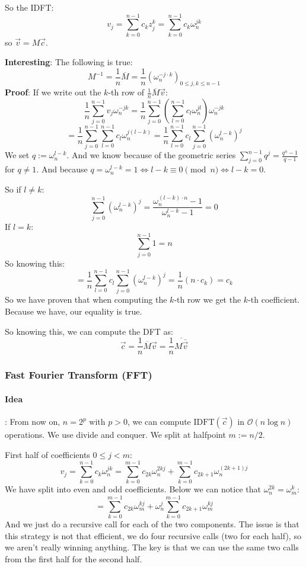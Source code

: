 \documentclass{article}
\begin{document}
So the IDFT:
\[v_j = \sum_{k=0}^{n-1}c_kz_j^k = \sum_{k=0}^{n-1}c_k\omega_n^{jk}\]
so $\vec{v} = M \vec{c}$.

\textbf{Interesting}: The following is true:
\[M^{-1} = \frac{1}{n}\overline{M} = \frac{1}{n}(\omega_n^{-j\cdot k})_{0\leq j,k \leq n-1}\]
\textbf{Proof}: If we write out the $k$-th row of $\frac{1}{n}\overline{M}\vec{v}$:
\[\frac{1}{n}\sum_{j=0}^{n-1}v_j\omega_n^{-jk} = \frac{1}{n}\sum_{j=0}^{n-1}\left(\sum_{l=0}^{n-1}c_l\omega_n^{jl}\right)\omega_n^{-jk}\]
\[ = \frac{1}{n}\sum_{j=0}^{n-1}\sum_{l=0}^{n-1}c_l \omega_n^{j(l-k)} = \frac{1}{n}\sum_{l=0}^{n-1}c_l\sum_{j=0}^{n-1}\left(\omega^{l-k}_n\right)^j\]
We set $q := \omega_n^{l-k}$. And we know because of the geometric series $\sum_{j=0}^{n-1}q^j = \frac{q^n-1}{q-1}$ for $q\neq 1$. And because $q = \omega_n^{l-k} = 1 \iff l-k \equiv 0 \pmod n \iff l-k = 0$.

So if $l\neq k$:
\[\sum_{j=0}^{n-1}(\omega_n^{l-k})^j = \frac{\omega_n^{(l-k)\cdot n} - 1}{\omega_n^{l-k} - 1} = 0\]
If $l = k$:
\[\sum_{j=0}^{n-1}1 = n\]
So knowing this:
\[ = \frac{1}{n}\sum_{l=0}^{n-1}c_l\sum_{j=0}^{n-1}(\omega_n^{l-k})^j = \frac{1}{n}(n\cdot c_k) = c_k\]
So we have proven that when computing the $k$-th row we get the $k$-th coefficient. Because we have, our equality is true.

So knowing this, we can compute the DFT as:
\[\vec{c} = \frac{1}{n}\overline{M}\vec{v} = \frac{1}{n}\overline{M\bar{\vec{v}}}\]

\subsubsection{Fast Fourier Transform (FFT)}
\paragraph{Idea}: From now on, $n = 2^p$ with $p > 0$, we can compute $\text{IDFT}(\vec{c})$ in $\mathcal{O}(n\log n)$ operations. We use divide and conquer. We split at halfpoint $m := n/2$.

First half of coefficients $0 \leq j < m$:
\[v_j = \sum_{k=0}^{n-1}c_k\omega_n^{jk} = \sum_{k=0}^{m-1}c_{2k}\omega_n^{2kj} + \sum_{k=0}^{m-1}c_{2k+1}\omega_n^{(2k + 1)j}\]
We have split into even and odd coefficients. Below we can notice that $\omega_n^{2k} = \omega_m^k$:
\[= \sum_{k=0}^{m-1}c_{2k}\omega_m^{kj} + \omega_n^j\sum_{k=0}^{m-1}c_{2k+1}\omega_m^{kj}\]
And we just do a recursive call for each of the two components. The issue is that this strategy is not that efficient, we do four recursive calls (two for each half), so we aren't really winning anything. The key is that we can use the same two calls from the first half for the second half.
\end{document}
